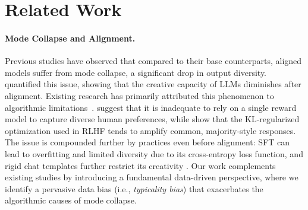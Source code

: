 \section{Related Work}\label{sec:related_work}
\paragraph{Mode Collapse and Alignment.} 

Previous studies \citep{padmakumar_does_2024, west2025basemodelsbeataligned} have observed that compared to their base counterparts, aligned models suffer from mode collapse, a significant drop in output diversity. \citet{lu2025aihumanityssalieriquantifying} quantified this issue, showing that the creative capacity of LLMs diminishes after alignment. Existing research has primarily attributed this phenomenon to algorithmic limitations~\citep{Casper2023OpenPA}. \cite{chakraborty2024maxmin} suggest that it is inadequate to rely on a single reward model to capture diverse human preferences, while \cite{xiao2024algorithmic} show that the KL-regularized optimization used in RLHF tends to amplify common, majority-style responses. The issue is compounded further by practices even before alignment: SFT can lead to overfitting and limited diversity due to its cross-entropy loss function,  and rigid chat templates further restrict its creativity \citep{yun2025price}.  %
Our work complements existing studies by introducing a fundamental data-driven perspective, where we identify a pervasive data bias (i.e., \textit{typicality bias}) that exacerbates the algorithmic causes of mode collapse. 

